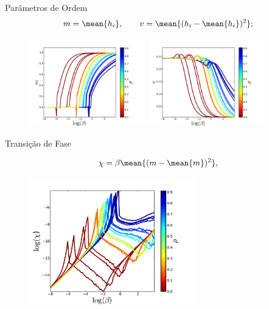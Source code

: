 \documentclass{beamer}
\begin{document}
   \begin{frame}{Parâmetros de Ordem}%
       \begin{align}
           m = \mean{h_i}, \qquad 
           v = \mean{(h_i - \mean{h_i})^2};
       \end{align}
       
       \begin{figure} 
           \includegraphics[width = 0.45\textwidth]{Figures/mag}
           \quad
           \includegraphics[width = 0.45\textwidth]{Figures/sigma}
       \end{figure}
   \end{frame}%

   \begin{frame}{Transição de Fase}%

       \begin{align}
           \chi = \beta\mean{(m - \mean{m})^2},
       \end{align}

       \begin{figure}
           \centering
           \includegraphics[width = 0.65\textwidth]{Figures/chi}
       \end{figure}
   \end{frame}%
\end{document}
